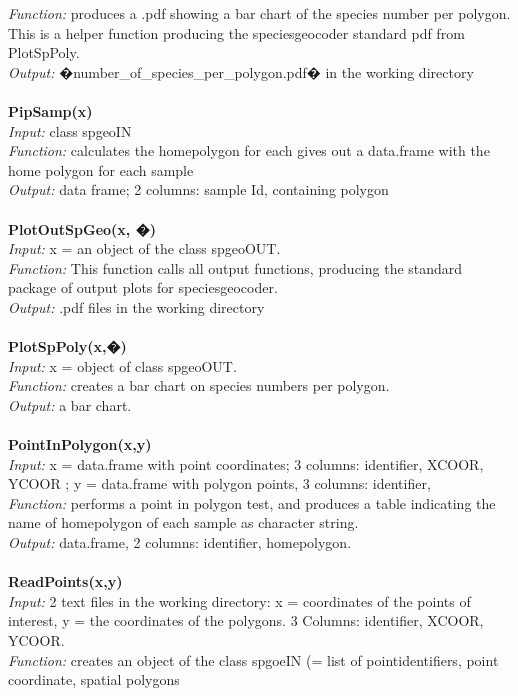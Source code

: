 \documentclass[a4paper,titlepage,11pt]{scrreprt}
\begin{document}
\textit{Function:} produces a .pdf showing a bar chart of the species number per polygon. This is a helper function producing the speciesgeocoder standard pdf from PlotSpPoly.\\
\textit{Output:} �number\_of\_species\_per\_polygon.pdf� in the working directory\\
\\
\textbf{PipSamp(x)}\\
\textit{Input:} class spgeoIN\\
\textit{Function:} calculates the homepolygon for each gives out a data.frame with the home polygon for each sample\\
\textit{Output:} data frame; 2 columns: sample Id, containing polygon \\
\\
\textbf{PlotOutSpGeo(x, �)}\\
\textit{Input:} x = an object of the class spgeoOUT.\\
\textit{Function:} This function calls all output functions, producing the standard package of output plots for speciesgeocoder.\\
\textit{Output:} .pdf files in the working directory\\
\\
\textbf{PlotSpPoly(x,�)}\\
\textit{Input:} x = object of class spgeoOUT.\\
\textit{Function:} creates a bar chart on species numbers per polygon.\\
\textit{Output:} a bar chart.\\
\\
\textbf{PointInPolygon(x,y)}\\
\textit{Input:} x = data.frame with point coordinates; 3 columns: identifier, XCOOR, YCOOR ; y = data.frame with polygon points, 3 columns: identifier, \\ 
\textit{Function:} performs a point in polygon test, and produces a table indicating the name of homepolygon of each sample as character string.\\
\textit{Output:} data.frame, 2 columns: identifier, homepolygon.\\
\\
\textbf{ReadPoints(x,y)}\\
\textit{Input:} 2 text files in the working directory: x = coordinates of the points of interest, y = the coordinates of the polygons. 3 Columns: identifier, XCOOR, YCOOR.\\
\textit{Function:} creates an object of the class spgoeIN (= list of pointidentifiers, point coordinate, spatial polygons\\
\end{document}
